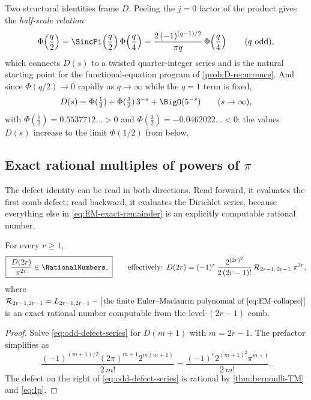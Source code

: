 Two structural identities frame $D$.  Peeling the $j=0$ factor of the
product gives the \emph{half-scale relation}
\begin{equation}
 \Phi\!\left(\frac q2\right)
 =\SincPi\!\left(\frac q2\right)\Phi\!\left(\frac q4\right)
 =\frac{2\,(-1)^{(q-1)/2}}{\pi q}\,
 \Phi\!\left(\frac q4\right)
 \qquad(q\ \text{odd}),
 \label{eq:half-scale}
\end{equation}
which connects $D(s)$ to a twisted quarter-integer series and is the
natural starting point for the functional-equation program of
\cref{prob:D-recurrence}.  And since $\Phi(q/2)\to0$ rapidly as
$q\to\infty$ while the $q=1$ term is fixed,
\begin{equation}
 D(s)=\Phi(\tfrac12)+\Phi(\tfrac32)\,3^{-s}+\BigO(5^{-s})
 \qquad(s\to\infty),
 \label{eq:D-first-harmonic}
\end{equation}
with $\Phi(\tfrac12)=0.5537712\ldots>0$ and
$\Phi(\tfrac32)=-0.0462022\ldots<0$: the values $D(s)$ increase to the
limit $\Phi(1/2)$ from below.

\subsection{Exact rational multiples of powers of \texorpdfstring{$\pi$}{pi}}

The defect identity can be read in both directions.  Read forward, it
evaluates the first comb defect; read backward, it evaluates the
Dirichlet series, because everything else in
\eqref{eq:EM-exact-remainder} is an explicitly computable rational
number.

\begin{theorem}
\label{thm:D-rational}
For every $r\ge1$,
\begin{equation}
 \boxed{\;\frac{D(2r)}{\pi^{2r}}\in\RationalNumbers,\;}
 \qquad\text{effectively: }
 D(2r)
 =(-1)^{r}\,
 \frac{2^{(2r)^2}}{2\,(2r-1)!}\,
 \defect_{2r-1,\,2r-1}\;\pi^{2r},
 \label{eq:D-rational}
\end{equation}
where $\mathcal R_{2r-1,2r-1}=L_{2r-1,2r-1}-\bigl[\text{the finite
Euler--Maclaurin polynomial of \eqref{eq:EM-collapse}}\bigr]$ is an
exact rational number computable from the level-$(2r-1)$ comb.
\end{theorem}

\begin{proof}
Solve \eqref{eq:odd-defect-series} for $D(m+1)$ with $m=2r-1$.  The
prefactor simplifies as
\[
 \frac{(-1)^{(m+1)/2}(2\pi)^{m+1}2^{m(m+1)}}{2\,m!}
 =\frac{(-1)^{r}2^{(m+1)^2}\pi^{m+1}}{2\,m!}.
\]
The defect on the right of
\eqref{eq:odd-defect-series} is rational by
\cref{thm:bernoulli-TM} and \eqref{eq:Ip}.
\end{proof}

